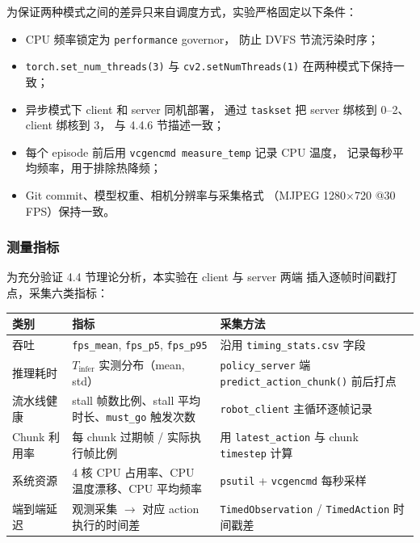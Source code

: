 为保证两种模式之间的差异只来自调度方式，实验严格固定以下条件：
\begin{itemize}[leftmargin=2em]
  \item CPU 频率锁定为 \texttt{performance} governor，
        防止 DVFS 节流污染时序；
  \item \texttt{torch.set\_num\_threads(3)} 与 \texttt{cv2.setNumThreads(1)}
        在两种模式下保持一致；
  \item 异步模式下 client 和 server 同机部署，
        通过 \texttt{taskset} 把 server 绑核到 0--2、client 绑核到 3，
        与 4.4.6 节描述一致；
  \item 每个 episode 前后用 \texttt{vcgencmd measure\_temp} 记录 CPU 温度，
        记录每秒平均频率，用于排除热降频；
  \item Git commit、模型权重、相机分辨率与采集格式
        （MJPEG 1280$\times$720 @30 FPS）保持一致。
\end{itemize}

\subsubsection{测量指标}\label{sec:async-exp-metrics}

为充分验证 4.4 节理论分析，本实验在 client 与 server 两端
插入逐帧时间戳打点，采集六类指标：

\begin{center}
\begin{tabular}{p{3.2cm}p{5.2cm}p{4cm}}
  \toprule
  类别 & 指标 & 采集方法 \\
  \midrule
  吞吐 & \texttt{fps\_mean}, \texttt{fps\_p5}, \texttt{fps\_p95}
       & 沿用 \texttt{timing\_stats.csv} 字段 \\
  推理耗时 & $T_{\text{infer}}$ 实测分布（mean, std）
       & \texttt{policy\_server} 端 \texttt{predict\_action\_chunk()} 前后打点 \\
  流水线健康 & stall 帧数比例、stall 平均时长、\texttt{must\_go} 触发次数
       & \texttt{robot\_client} 主循环逐帧记录 \\
  Chunk 利用率 & 每 chunk 过期帧 / 实际执行帧比例
       & 用 \texttt{latest\_action} 与 chunk \texttt{timestep} 计算 \\
  系统资源 & 4 核 CPU 占用率、CPU 温度漂移、CPU 平均频率
       & \texttt{psutil} + \texttt{vcgencmd} 每秒采样 \\
  端到端延迟 & 观测采集 $\to$ 对应 action 执行的时间差
       & \texttt{TimedObservation} / \texttt{TimedAction} 时间戳差 \\
  \bottomrule
\end{tabular}
\end{center}

